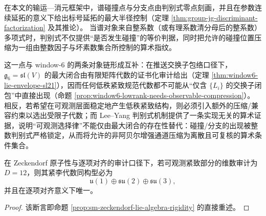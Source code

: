 \begin{remark}\label{rem:window6-leyang-discriminant-necessity}
在本文的输运—消元框架中，谱碰撞点与分支点由判别式零点刻画，并且在参数连续延拓的意义下给出标号延拓的最大半径控制（定理 \ref{thm:group-jg-discriminant-factorization} 及其推论）。
当谱对象来自整系数（或有理系数清分母后的整系数）多项式时，判别式不仅提供“是否发生碰撞”的等价判据，同时把允许的碰撞位置压缩为一组由整数因子与坏素数集合所控制的算术指纹。\par
这一点与 window-\(6\) 的两条对象链形成互补：在推送交换子包络口径下，\(\mathfrak g_6=\mathfrak{sl}(V)\) 的最大闭合由有限矩阵代数的证书化审计给出（定理 \ref{thm:window6-lie-envelope-sl21}），因而任何低秩紧致规范代数都不可能从“仅含 \(\{L_i\}\) 的交换子闭包”中直接出现（命题 \ref{prop:window6-lowrank-needs-observable-compression}）。
相反，若希望在可观测层面稳定地产生低秩紧致结构，则必须引入额外的压缩/兼容约束以选出受限子代数；而 Lee--Yang 判别式机制提供了一条实现无关的算术证据，说明“可观测选择律”不能仅由最大闭合的存在性替代：碰撞/分支的出现被整数判别式严格锁定，从而将允许的非阿贝尔增强通道压缩为离散且可复核的算术条件集合。
\end{remark}

\begin{proposition}\label{prop:window6-sm-uniqueness-from-zeckendorf-under-compactness}
在 Zeckendorf 原子性与逐项对齐的审计口径下，若可观测紧致部分的维数审计为 \(D=12\)，则其紧李代数同构型必为
\[
\mathfrak u(1)\oplus \mathfrak{su}(2)\oplus \mathfrak{su}(3),
\]
并且在逐项对齐意义下唯一。
\end{proposition}

\begin{proof}
该断言即命题 \ref{prop:sm-zeckendorf-lie-algebra-rigidity} 的直接重述。
\end{proof}

